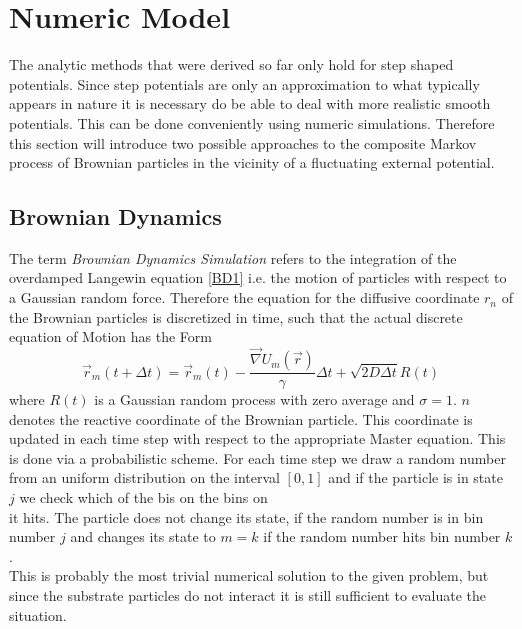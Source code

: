 \chapter{Numeric Model}
\label{numeric_model}
The analytic methods that were derived so far only hold for step shaped potentials. Since step potentials are only an approximation to what typically appears in nature it is necessary do be able to deal with more realistic smooth potentials. This can be done conveniently using numeric simulations. Therefore this section will introduce two possible approaches to the composite Markov process of Brownian particles in the vicinity of a fluctuating external potential.
\section{Brownian Dynamics}
\label{BDsim}
The term \textit{Brownian Dynamics Simulation} refers to the integration of the overdamped Langewin equation \eqref{BD1} i.e. the motion of particles with respect to a Gaussian random force. Therefore the equation for the diffusive coordinate $r_n$ of the Brownian particles is discretized in time, such that the actual discrete equation of Motion has the Form
\begin{equation}
    \vec r_m(t + \Delta t) = \vec r_m(t) - \frac{\vec \nabla U_m(\vec r)}{\gamma}\Delta t + \sqrt{2 D \Delta t} R(t)
    \label{discrete_eqm}
\end{equation}
where $R(t)$ is a Gaussian random process with zero average and $\sigma = 1$. $n$ denotes the reactive coordinate of the Brownian particle. This coordinate is updated in each time step with respect to the appropriate Master equation. This is done via a probabilistic scheme. For each time step we draw a random number from an uniform distribution on the interval $[0,1]$ and if the particle is in state $j$ we check which of the bis on the bins on 
\begin{equation}
    [W_{1,j}, \cdots , W_{j-1,j},1 - \sum_{i \ne j} W_{i,j}, W_{j+1,j}, \cdots , W_{M,j}]
    \label{num_meq}
\end{equation}
it hits. The particle does not change its state, if the random number is in bin number $j$ and changes its state to $m = k$ if the random number hits bin number $k$.\\
This is probably the most trivial numerical solution to the given problem, but since the substrate particles do not interact it is still sufficient to evaluate the situation.

